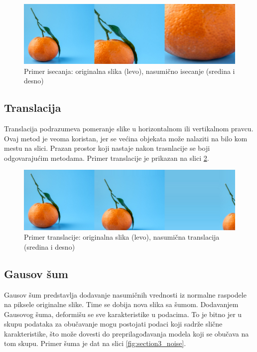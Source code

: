 \documentclass[12pt,oneside]{memoir}
\begin{document}
\begin{figure}[ht]
    \centering
    \includegraphics[width=1\textwidth]{matfmaster/glava3/crop.jpg}
    \caption{Primer isecanja: originalna slika (levo), nasumično isecanje (sredina i desno) \cite{unsplashOrange}}
    \label{fig:section3_cut}
\end{figure}

\subsection{Translacija}
Translacija podrazumeva pomeranje slike u horizontalnom ili vertikalnom pravcu. Ovaj metod je veoma koristan, jer se većina objekata može nalaziti na bilo kom mestu na slici. Prazan prostor koji nastaje nakon trasnlacije se boji odgovarajućim metodama. Primer translacije je prikazan na slici \ref{fig:section3_trans}.

\begin{figure}[ht]
    \centering
    \includegraphics[width=1\textwidth]{matfmaster/glava3/translate.jpg}
    \caption{Primer translacije: originalna slika (levo), nasumična translacija (sredina i desno) \cite{unsplashOrange}}
    \label{fig:section3_trans}
\end{figure}

\subsection{Gausov šum}
Gausov šum predstavlja dodavanje nasumičnih vrednosti iz normalne raspodele na piksele originalne slike. Time se dobija nova slika sa šumom. Dodavanjem Gausovog šuma, deformišu se sve karakteristike u podacima. To je bitno jer u skupu podataka za obučavanje mogu postojati podaci koji sadrže slične karakteristike, što može dovesti do preprilagođavanja modela koji se obučava na tom skupu. Primer šuma je dat na slici \ref{fig:section3_noise}.
\end{document}
